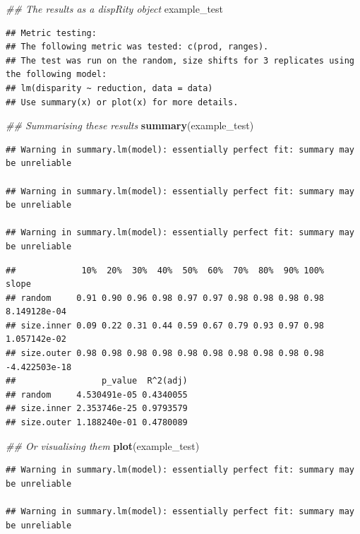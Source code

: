 \documentclass[]{book}
\newenvironment{Shaded}{\begin{snugshade}}{\end{snugshade}}
\newcommand{\CommentTok}[1]{\textcolor[rgb]{0.56,0.35,0.01}{\textit{#1}}}
\newcommand{\KeywordTok}[1]{\textcolor[rgb]{0.13,0.29,0.53}{\textbf{#1}}}
\newcommand{\NormalTok}[1]{#1}
\begin{document}
\begin{Shaded}
\begin{Highlighting}[]
\CommentTok{## The results as a dispRity object}
\NormalTok{example_test}
\end{Highlighting}
\end{Shaded}

\begin{verbatim}
## Metric testing:
## The following metric was tested: c(prod, ranges).
## The test was run on the random, size shifts for 3 replicates using the following model:
## lm(disparity ~ reduction, data = data)
## Use summary(x) or plot(x) for more details.
\end{verbatim}

\begin{Shaded}
\begin{Highlighting}[]
\CommentTok{## Summarising these results}
\KeywordTok{summary}\NormalTok{(example_test)}
\end{Highlighting}
\end{Shaded}

\begin{verbatim}
## Warning in summary.lm(model): essentially perfect fit: summary may be unreliable

## Warning in summary.lm(model): essentially perfect fit: summary may be unreliable

## Warning in summary.lm(model): essentially perfect fit: summary may be unreliable
\end{verbatim}

\begin{verbatim}
##             10%  20%  30%  40%  50%  60%  70%  80%  90% 100%         slope
## random     0.91 0.90 0.96 0.98 0.97 0.97 0.98 0.98 0.98 0.98  8.149128e-04
## size.inner 0.09 0.22 0.31 0.44 0.59 0.67 0.79 0.93 0.97 0.98  1.057142e-02
## size.outer 0.98 0.98 0.98 0.98 0.98 0.98 0.98 0.98 0.98 0.98 -4.422503e-18
##                 p_value  R^2(adj)
## random     4.530491e-05 0.4340055
## size.inner 2.353746e-25 0.9793579
## size.outer 1.188240e-01 0.4780089
\end{verbatim}

\begin{Shaded}
\begin{Highlighting}[]
\CommentTok{## Or visualising them}
\KeywordTok{plot}\NormalTok{(example_test)}
\end{Highlighting}
\end{Shaded}

\begin{verbatim}
## Warning in summary.lm(model): essentially perfect fit: summary may be unreliable

## Warning in summary.lm(model): essentially perfect fit: summary may be unreliable
\end{verbatim}
\end{document}
